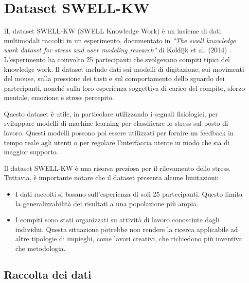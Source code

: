 \pagestyle{fancy}

\fancyhf{}

\fancyfoot[C]{\thepage}


\chapter{Dataset SWELL-KW}

\large

IL dataset SWELL-KW (SWELL Knowledge Work) è un insieme di dati multimodali raccolti in un esperimento, documentato in \textit{"The swell knowledge work dataset for stress and user modeling research"} di Koldijk et al. (2014) \cite{koldijk2014swell}. L'esperimento ha coinvolto 25 partecipanti che svolgevano compiti tipici del knowledge work. Il dataset include dati sui modelli di digitazione, sui movimenti del mouse, sulla pressione dei tasti e sul comportamento dello sguardo dei partecipanti, nonché sulla loro esperienza soggettiva di carico del compito, sforzo mentale, emozione e stress percepito.

\bigskip

Questo dataset è utile, in particolare utilizzando i segnali fisiologici, per sviluppare modelli di machine learning per classificare lo stress sul posto di lavoro. Questi modelli possono poi essere utilizzati per fornire un feedback in tempo reale agli utenti o per regolare l'interfaccia utente in modo che sia di maggior supporto.

\bigskip

Il dataset SWELL-KW è una risorsa preziosa per il rilevamento dello stress. Tuttavia, è importante notare che il dataset presenta alcune limitazioni:

\begin{itemize}
    \item I dati raccolti si basano sull'esperienza di soli 25 partecipanti. Questo limita la generalizzabilità dei risultati a una popolazione più ampia.
    \item I compiti sono stati organizzati su attività di lavoro conosciute dagli individui. Questa situazione potrebbe non rendere la ricerca applicabile ad altre tipologie di impieghi, come lavori creativi, che richiedono più inventiva che metodologia.
\end{itemize}

\section{Raccolta dei dati}

